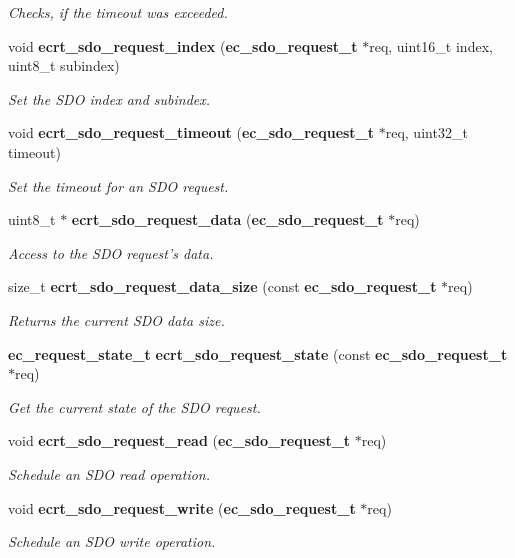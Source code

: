 \begin{DoxyCompactItemize}
\begin{DoxyCompactList}\small\item\em Checks, if the timeout was exceeded. \end{DoxyCompactList}\item 
void {\bf ecrt\-\_\-sdo\-\_\-request\-\_\-index} ({\bf ec\-\_\-sdo\-\_\-request\-\_\-t} $\ast$req, uint16\-\_\-t index, uint8\-\_\-t subindex)
\begin{DoxyCompactList}\small\item\em Set the S\-D\-O index and subindex. \end{DoxyCompactList}\item 
void {\bf ecrt\-\_\-sdo\-\_\-request\-\_\-timeout} ({\bf ec\-\_\-sdo\-\_\-request\-\_\-t} $\ast$req, uint32\-\_\-t timeout)
\begin{DoxyCompactList}\small\item\em Set the timeout for an S\-D\-O request. \end{DoxyCompactList}\item 
uint8\-\_\-t $\ast$ {\bf ecrt\-\_\-sdo\-\_\-request\-\_\-data} ({\bf ec\-\_\-sdo\-\_\-request\-\_\-t} $\ast$req)
\begin{DoxyCompactList}\small\item\em Access to the S\-D\-O request's data. \end{DoxyCompactList}\item 
size\-\_\-t {\bf ecrt\-\_\-sdo\-\_\-request\-\_\-data\-\_\-size} (const {\bf ec\-\_\-sdo\-\_\-request\-\_\-t} $\ast$req)
\begin{DoxyCompactList}\small\item\em Returns the current S\-D\-O data size. \end{DoxyCompactList}\item 
{\bf ec\-\_\-request\-\_\-state\-\_\-t} {\bf ecrt\-\_\-sdo\-\_\-request\-\_\-state} (const {\bf ec\-\_\-sdo\-\_\-request\-\_\-t} $\ast$req)
\begin{DoxyCompactList}\small\item\em Get the current state of the S\-D\-O request. \end{DoxyCompactList}\item 
void {\bf ecrt\-\_\-sdo\-\_\-request\-\_\-read} ({\bf ec\-\_\-sdo\-\_\-request\-\_\-t} $\ast$req)
\begin{DoxyCompactList}\small\item\em Schedule an S\-D\-O read operation. \end{DoxyCompactList}\item 
void {\bf ecrt\-\_\-sdo\-\_\-request\-\_\-write} ({\bf ec\-\_\-sdo\-\_\-request\-\_\-t} $\ast$req)
\begin{DoxyCompactList}\small\item\em Schedule an S\-D\-O write operation. \end{DoxyCompactList}\end{DoxyCompactItemize}


